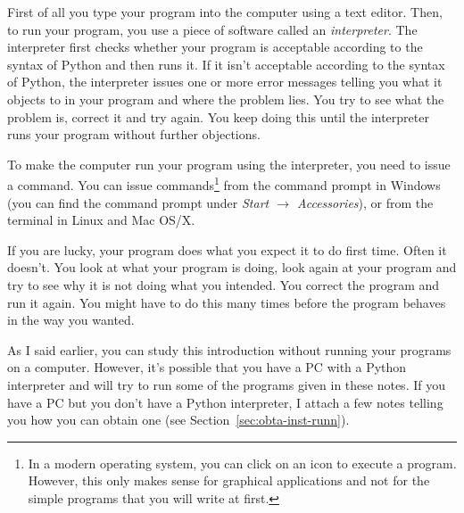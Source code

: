 First of all you type your program into the computer using a text
editor.
Then, to run your program, you use a piece of software called
an \emph{interpreter}.
The interpreter first checks whether your program is acceptable according
to the syntax of Python and then runs it.
If it isn't acceptable according to the syntax of Python,
the interpreter issues one or more error messages telling you
what it objects to in your program and where the problem lies.
You try to see what the problem is, correct it and try again.  You keep
doing this until the interpreter runs your program without further
objections.

To make the computer run your program using the interpreter, you need to
issue a command. You can issue commands\footnote{In
    a modern operating system, you can click on an icon to execute a
    program. However, this only makes sense for graphical applications
    and not for the simple programs that you will write at first.}
from the command prompt in Windows (you can find the command prompt under 
\emph{Start $\rightarrow$
    Accessories}), or from the terminal in Linux and Mac OS/X.


If you are lucky, your program does what you expect it 
to do first time.  Often it doesn't.  You look at what your program is
doing, look again at your program and try to see why it is not doing what
you intended.  You correct the program and run it again.
You might have to do this many times before the program behaves in the way
you wanted. 

As I said earlier, you can study this introduction without running your
programs on a computer.  However, it's possible that you have a PC with
a Python interpreter and will try to run some of the programs given in these
notes. 
If you have a PC but you don't have a
Python interpreter, I attach a few notes telling
you how you can obtain one (see Section~\ref{sec:obta-inst-runn}).

